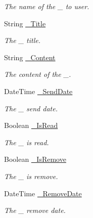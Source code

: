 \begin{DoxyCompactItemize}
\begin{DoxyCompactList}\small\item\em The name of the \+\_\+ to user. \end{DoxyCompactList}\item 
String \mbox{\hyperlink{class_t_net_1_1_message_1_1_mail_message_ab8801820a537f322b4af91cae759b580}{\+\_\+\+Title}}
\begin{DoxyCompactList}\small\item\em The \+\_\+ title. \end{DoxyCompactList}\item 
String \mbox{\hyperlink{class_t_net_1_1_message_1_1_mail_message_aff15c9779b4722dae9281828647cae5a}{\+\_\+\+Content}}
\begin{DoxyCompactList}\small\item\em The content of the \+\_\+. \end{DoxyCompactList}\item 
Date\+Time \mbox{\hyperlink{class_t_net_1_1_message_1_1_mail_message_ac93c5e9b198a514a3c042851c29dca05}{\+\_\+\+Send\+Date}}
\begin{DoxyCompactList}\small\item\em The \+\_\+ send date. \end{DoxyCompactList}\item 
Boolean \mbox{\hyperlink{class_t_net_1_1_message_1_1_mail_message_a2aa47535a1cbd823a593c75aad11becd}{\+\_\+\+Is\+Read}}
\begin{DoxyCompactList}\small\item\em The \+\_\+ is read. \end{DoxyCompactList}\item 
Boolean \mbox{\hyperlink{class_t_net_1_1_message_1_1_mail_message_aa9fc0aef516acc999845c2cb32e1b41d}{\+\_\+\+Is\+Remove}}
\begin{DoxyCompactList}\small\item\em The \+\_\+ is remove. \end{DoxyCompactList}\item 
Date\+Time \mbox{\hyperlink{class_t_net_1_1_message_1_1_mail_message_add442d74ffeee3ed1d31a0ecf387ba68}{\+\_\+\+Remove\+Date}}
\begin{DoxyCompactList}\small\item\em The \+\_\+ remove date. \end{DoxyCompactList}\end{DoxyCompactItemize}
